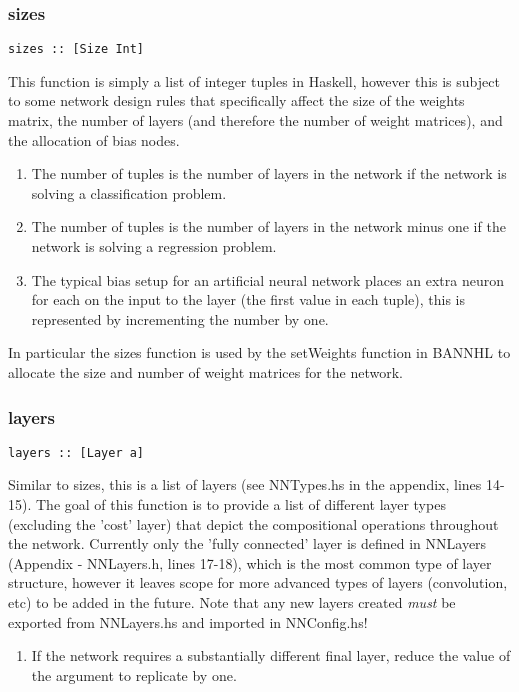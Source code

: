 \documentclass[a4paper]{article}
\begin{document}
\subsubsection{sizes}
\begin{verbatim} 
sizes :: [Size Int]
\end{verbatim}
This function is simply a list of integer tuples in Haskell,
however this is subject to some network design rules that specifically
affect the size of the weights matrix, the number of layers (and therefore
the number of weight matrices), and the allocation of bias nodes.
   \begin{enumerate}
     \item The number of tuples is the number of layers in the network if
     the network is solving a classification problem.
     \item The number of tuples is the number of layers in the network minus
     one if the network is solving a regression problem.
     \item The typical bias setup for an artificial neural network places an
     extra neuron for each on the input to the layer (the first value in each
     tuple), this is represented by incrementing the number by one.
   \end{enumerate}
In particular the sizes function is used by the setWeights function in BANNHL
to allocate the size and number of weight matrices for the network.

\subsubsection{layers}
\begin{verbatim} 
layers :: [Layer a]
\end{verbatim}
Similar to sizes, this is a list of layers (see NNTypes.hs in the appendix,
lines 14-15). The goal of this function is to provide a list of different layer
types (excluding the 'cost' layer) that depict the compositional operations
throughout the network. Currently only the 'fully connected' layer is defined
in NNLayers (Appendix - NNLayers.h, lines 17-18), which is the most common type
of layer structure, however it leaves scope for more advanced types of layers
(convolution, etc) to be added in the future. Note that any new layers created
\textit{must} be exported from NNLayers.hs and imported in NNConfig.hs!
\begin{enumerate}
   \item If the network requires a substantially different final layer, reduce
   the value of the argument to replicate by one.
\end{enumerate}
\end{document}
